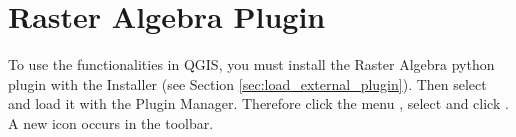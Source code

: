 
\section{Raster Algebra Plugin}\label{sec:ftools}

\updatedisclaimer


To use the functionalities in QGIS, you must install the Raster Algebra
python plugin with the  Installer
(see Section \ref{sec:load_external_plugin}). Then select and load it
with the Plugin Manager. Therefore click the menu  \arrow
{}, select  and click
. A new  icon occurs
in the toolbar.
